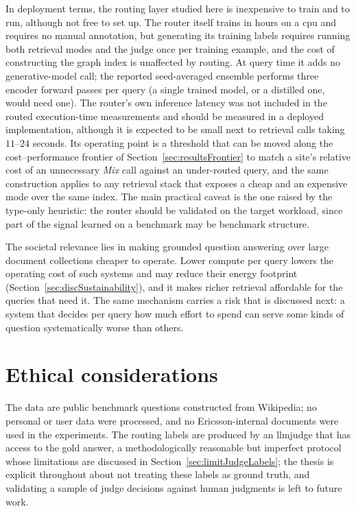 \documentclass[english, bibtex]{kththesis}               %
\numberwithin{listing}{chapter}
\begin{document}
In deployment terms, the routing layer studied here is inexpensive to train and to run, although not free to set up. The router itself trains in hours on a \gls{cpu} and requires no manual annotation, but generating its training labels requires running both retrieval modes and the judge once per training example, and the cost of constructing the graph index is unaffected by routing. At query time it adds no generative-model call; the reported seed-averaged ensemble performs three encoder forward passes per query (a single trained model, or a distilled one, would need one). The router's own inference latency was not included in the routed execution-time measurements and should be measured in a deployed implementation, although it is expected to be small next to retrieval calls taking $11$--$24$ seconds. Its operating point is a threshold that can be moved along the cost--performance frontier of Section~\ref{sec:resultsFrontier} to match a site's relative cost of an unnecessary \emph{Mix} call against an under-routed query, and the same construction applies to any retrieval stack that exposes a cheap and an expensive mode over the same index. The main practical caveat is the one raised by the type-only heuristic: the router should be validated on the target workload, since part of the signal learned on a benchmark may be benchmark structure.

The societal relevance lies in making grounded question answering over large document collections cheaper to operate. Lower compute per query lowers the operating cost of such systems and may reduce their energy footprint (Section~\ref{sec:discSustainability}), and it makes richer retrieval affordable for the queries that need it. The same mechanism carries a risk that is discussed next: a system that decides per query how much effort to spend can serve some kinds of question systematically worse than others.

\section{Ethical considerations}
\label{sec:discEthics}

The data are public benchmark questions constructed from Wikipedia; no personal or user data were processed, and no Ericsson-internal documents were used in the experiments. The routing labels are produced by an \gls{llmjudge} that has access to the gold answer, a methodologically reasonable but imperfect protocol whose limitations are discussed in Section~\ref{sec:limitJudgeLabels}; the thesis is explicit throughout about not treating these labels as ground truth, and validating a sample of judge decisions against human judgments is left to future work.
\end{document}
